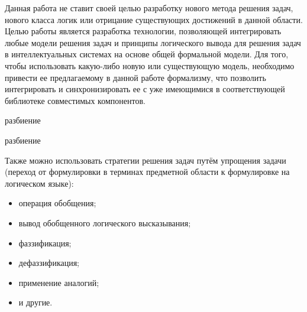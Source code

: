 Данная работа не ставит своей целью разработку нового метода решения задач, нового класса логик или отрицание существующих достижений в данной области. Целью работы является разработка технологии, позволяющей интегрировать любые модели решения задач и принципы логического вывода для решения задач в интеллектуальных системах на основе общей формальной модели. Для того, чтобы использовать какую-либо новую или существующую модель, необходимо привести ее предлагаемому в данной работе формализму, что позволить интегрировать и синхронизировать ее с уже имеющимися в соответствующей библиотеке совместимых компонентов.

\begin{SCn}
	\begin{scneqtoset}
		\begin{scnindent}
			\begin{scnrelfromset}{разбиение}
				\begin{scnindent}
					\begin{scnrelfromset}{разбиение}
					\end{scnrelfromset}
				\end{scnindent}
			\end{scnrelfromset}
		\end{scnindent}
	\end{scneqtoset}
\end{SCn}

Также можно использовать стратегии решения задач путём упрощения задачи (переход от формулировки в терминах предметной области к формулировке на логическом языке):
\begin{itemize}
	\item{операция обобщения;}
	\item{вывод обобщенного логического высказывания;}
	\item{фаззификация;}
	\item{дефаззификация;}
	\item{применение аналогий;}
	\item{и другие.}
\end{itemize}

